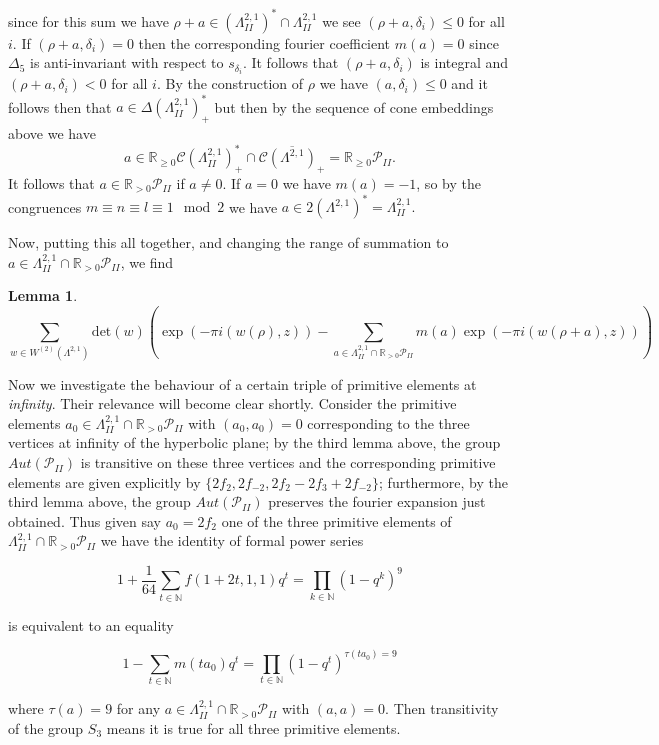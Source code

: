 \documentclass[9pt]{amsart} \usepackage[utf8]{inputenc}
\newtheorem{lemma}{Lemma}
\newcommand{\N}{\mathbb{N}}
\newcommand{\R}{\mathbb{R}} \newcommand{\La}{\Lambda}
\newcommand{\Cone}{\mathcal{C}}
\newcommand{\Poly}{\mathcal{P}}
\begin{document}
since for this sum we have $\rho +a \in (\La^{2,1}_{II})^* \cap
\La^{2,1}_{II}$ we see $(\rho +a, \delta_i) \leq 0$ for all $i$. If
$(\rho + a, \delta_i) = 0$ then the corresponding fourier coefficient
$m(a) = 0$ since $\Delta_5$ is anti-invariant with respect to
$s_{\delta_i}$. It follows that $(\rho +a, \delta_i)$ is integral and
$(\rho +a, \delta_i) < 0$ for all $i$. By the construction of $\rho$ we
have $(a, \delta_i) \leq 0$ and it follows then that $a \in \Delta(\La^{2,1}_{II})^*_+$ but then by the sequence of cone embeddings
above we have $$a \in \R_{\geq 0} \Cone(\La^{2,1}_{II})_+^* \cap
\overline{\Cone(\La^{2,1})_+} = \R_{\geq 0} \Poly_{II}.$$ It follows
that $a \in \R_{>0}\Poly_{II}$ if $a \neq 0$. If $a = 0$ we have $m(a) =
-1$, so by the congruences $m\equiv n \equiv l \equiv 1 \mod 2$ we have $a \in 2
(\La^{2,1})^* = \La^{2,1}_{II}.$


Now, putting this all together, and changing the range of summation to
$a \in \La^{2,1}_{II} \cap \R_{> 0}\Poly_{II}$, we find
\begin{lemma}
$$\displaystyle\sum_{w \in W^{(2)}(\La^{2,1})} \text{det}(w)( \exp(-\pi
i(w(\rho),z))- \sum_{a \in \La^{2,1}_{II}\cap\R_{>0}\Poly_{II}}
m(a)\exp(-\pi i(w(\rho+a),z)))$$
\end{lemma}

Now we investigate the behaviour of a certain triple of primitive
elements at \textit{infinity}. Their relevance will become clear
shortly. Consider the primitive elements $a_0 \in \La^{2,1}_{II} \cap \R_{>0} \Poly_{II}$ with $(a_0,a_0) = 0$ corresponding to the three
vertices at infinity of the hyperbolic plane; by the third lemma above, the group
$Aut(\Poly_{II})$ is transitive on these three vertices and the
corresponding primitive elements are given explicitly by $\{2f_2,
2f_{-2}, 2f_2 - 2f_3 + 2 f_{-2}\}$; furthermore, by the third lemma above, the
group $Aut(\Poly_{II})$ preserves the fourier expansion just
obtained. Thus given say $a_0 = 2 f_2$ one of the three primitive
elements of $\La^{2,1}_{II} \cap \R_{>0}\Poly_{II}$ we have the identity
of formal power series

$$1 + \frac{1}{64} \sum_{t \in \N} f(1 + 2t, 1, 1)q^t = \displaystyle\prod_{k\in \N} (1
- q^k)^9$$

is equivalent to an equality

$$ 1 - \sum_{t \in \N} m(t a_0) q^t = \displaystyle\prod_{t\in \N}
(1 - q^t)^{\tau(t a_0) = 9 }$$

where $\tau(a) = 9$ for any  $a \in \La^{2,1}_{II} \cap \R_{>0}
\Poly_{II}$ with $(a,a) = 0$. Then transitivity
of the group $S_3$ means it is true for all three primitive elements.
\end{document}
